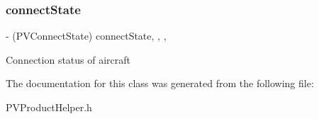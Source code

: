\subsubsection{\texorpdfstring{connect\+State}{connectState}}
{\footnotesize\ttfamily -\/ (P\+V\+Connect\+State) connect\+State\hspace{0.3cm}{\ttfamily [read]}, {\ttfamily [write]}, {\ttfamily [nonatomic]}, {\ttfamily [assign]}}

Connection status of aircraft 

The documentation for this class was generated from the following file\+:\begin{DoxyCompactItemize}
\item 
P\+V\+Product\+Helper.\+h\end{DoxyCompactItemize}
